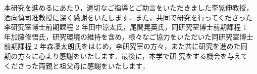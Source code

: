 本研究を進めるにあたり，適切なご指導とご助言をいただきました李晃伸教授，酒向慎司准教授に深く感謝をいたします．また，共同で研究を行ってくださった李研究室博士前期課程 2 年田中涼太氏，尾関晃英氏，同研究室博士前期課程 1 年加藤修悟氏，研究環境の維持を含め，様々なご協力をいただいた同研究室博士前期課程 2 年森凜太朗氏をはじめ，李研究室の方々，また共に研究を進めた同期の方々に心より感謝をいたします．最後に，本学で研
究をする機会を与えてくださった両親と祖父母に感謝をいたします．